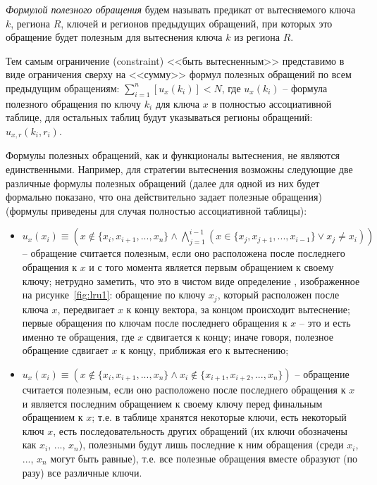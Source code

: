 \emph{Формулой полезного обращения} будем называть предикат от вытесняемого ключа $k$, региона $R$, ключей и регионов предыдущих обращений, при которых это обращение будет полезным для вытеснения ключа $k$ из региона $R$.

Тем самым ограничение (constraint) <<быть вытесненным>> представимо в виде
ограничения сверху на <<сумму>> формул полезных обращений по всем предыдущим обращениям: $\sum_{i=1}^n [u_x(k_i)] < N$, где $u_x(k_i)$ -- формула полезного обращения по ключу $k_i$ для ключа $x$ в полностью ассоциативной таблице, для остальных таблиц будут указываться регионы обращений: $u_{x,r}(k_i, r_i)$.

Формулы полезных обращений, как и функционалы вытеснения, не являются единственными. Например, для стратегии вытеснения \LRU возможны следующие две различные формулы полезных обращений (далее для одной из них будет формально показано, что она действительно задает полезные обращения) (формулы приведены для случая полностью ассоциативной таблицы):
\begin{itemize}
  \item $u_x(x_i) \equiv (x \notin \{x_i, x_{i+1}, ..., x_n\} \wedge
\bigwedge\limits_{j=1}^{i-1} (x \in \{x_j, x_{j+1}, ..., x_{i-1}\} \vee x_j
\neq x_i))$ -- обращение считается полезным, если оно расположена после
последнего обращения к $x$ и с того момента является первым обращением к своему
ключу; нетрудно заметить, что это в чистом виде определение \LRU, изображенное на рисунке~\ref{fig:lru1}: обращение по ключу $x_j$, который расположен после ключа $x$, передвигает $x$ к концу вектора, за концом происходит вытеснение; первые обращения по ключам после последнего обращения к $x$ -- это и есть именно те обращения, где $x$ сдвигается к концу; иначе говоря, полезное обращение сдвигает $x$ к концу, приближая его к вытеснению;
  \item $u_x(x_i) \equiv (x \notin \{x_i, x_{i+1}, ..., x_n\} \wedge x_i \notin
\{x_{i+1}, x_{i+2}, ..., x_n\})$ -- обращение считается полезным, если оно
расположено после последнего обращения к $x$ и является последним обращением к
своему ключу перед финальным обращением к $x$; т.е. в таблице хранятся некоторые ключи, есть некоторый ключ $x$, есть последовательность других обращений (их
ключи обозначены как  $x_i$, ..., $x_n$), полезными будут лишь последние к ним обращения (среди $x_i$, ..., $x_n$ могут быть равные), т.е. все полезные обращения вместе образуют (по разу) все различные ключи.
\end{itemize}

